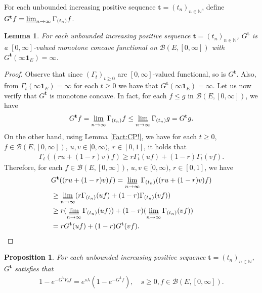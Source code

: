 \documentclass[12pt,a4paper]{amsart}
\numberwithin{equation}{section}
\theoremstyle{plain}
\newtheorem{lem}[thm]{Lemma}
\newtheorem{prop}[thm]{Proposition}
\theoremstyle{definition}
\theoremstyle{remark}
\newcounter{N}
\newcounter{n}[N]
\begin{document}
For each unbounded increasing positive sequence $\mathbf t = (t_n)_{n\in \mathbb N}$, define $G^\mathbf t f = \varliminf_{n\to \infty} \Gamma_{(t_n)} f$. 
\begin{lem} \label{Lemma:Gta!} 
For each unbounded increasing positive sequence $\mathbf t = (t_n)_{n\in \mathbb N}$, $G^\mathbf t$ is a $[0,\infty]$-valued monotone concave functional on $\mathcal B(E,[0,\infty])$ with $G^\mathbf t(\infty \mathbf 1_E) = \infty$.
\end{lem}
\begin{proof}
Observe that since $(\Gamma_t)_{t\geq 0}$ are $[0,\infty]$-valued functional, so is $G^{\mathbf t}$. 
Also, from $\Gamma_t(\infty \mathbf 1_E) = \infty$ for each $t\geq 0$ we have that $G^{\mathbf t}(\infty \mathbf 1_E) = \infty$. 
Let us now verify that $G^\mathbf t$ is monotone concave. 
In fact, for each $f \leq g$ in $\mathcal B(E,[0,\infty])$, we have
\begin{align} 
 G^{\mathbf t} f 
 = \varliminf_{n\to \infty} \Gamma_{(t_n)} f
   \leq \varliminf_{n\to \infty} \Gamma_{(t_n)} g
  = G^{\mathbf t} g.
   \end{align}
On the other hand, using Lemma \ref{Fact:CP!}, we have for each $t\geq 0$, $f\in \mathcal B(E,[0,\infty])$, $u,v \in [0,\infty)$, $r\in [0,1]$, it holds that
\begin{align}
 \Gamma_t((ru+(1-r) v)f) 
  \geq r \Gamma_t (uf) + (1-r) \Gamma_t (vf).
 \end{align}
Therefore, for each $f\in \mathcal B(E,[0,\infty])$, $u,v \in [0,\infty)$, $r \in [0,1]$, we have
\begin{align}
 & G^{\mathbf t}((ru + (1-r)v)f)
 = \varliminf_{n \to \infty} \Gamma_{(t_n)}((ru + (1-r)v)f)
 \\&\geq \varliminf_{n\to \infty} (r\Gamma_{(t_n)} (uf) + (1-r)\Gamma_{(t_n)}(vf)) 
 \\&\geq r (\varliminf_{n\to \infty} \Gamma_{(t_n)} (uf)) + (1-r) (\varliminf_{n\to \infty} \Gamma_{(t_n)}(vf) )
 \\&= r G^{\mathbf t} (uf) + (1-r) G^{\mathbf t}(vf). \qedhere
 \end{align}
\end{proof}
\begin{prop} \label{Proposition:Gtb:H1:H2:H3:H4} 
For each unbounded increasing positive sequence $\mathbf t = (t_n)_{n\in \mathbb N}$, $G^\mathbf t$ satisfies that 
\begin{align}
 1 - e^{-G^\mathbf t V_s f} 
 = e^{s\lambda} (1-e^{- G^\mathbf t f}), 
 \quad s\geq 0, f\in \mathcal B(E,[0,\infty]).
 \end{align}
\end{prop}
\end{document}
